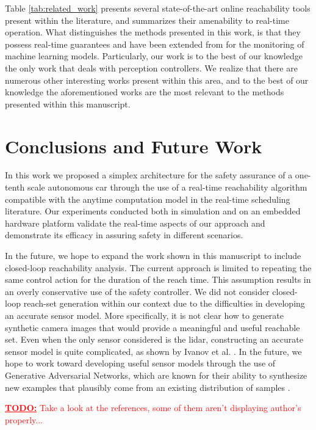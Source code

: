 \documentclass[manuscript,screen,review]{acmart}
\newcommand{\todo}[1]{\textcolor{red}{\textbf{\underline{TODO:}} #1}}
\begin{document}
Table \ref{tab:related_work} presents several state-of-the-art online reachability tools present within the literature, and summarizes their amenability to real-time operation. What distinguishes the methods presented in this work, is that they possess real-time guarantees and have been extended from \cite{Johnson2016} for the monitoring of machine learning models. Particularly, our work is to the best of our knowledge the only work that deals with perception controllers. We realize that there are numerous other interesting works present within this area, and to the best of our knowledge the aforementioned works are the most relevant to the methods presented within this manuscript.   

\section{Conclusions and Future Work}

In this work we proposed a simplex architecture for the safety assurance of a one-tenth scale autonomous car through the use of a real-time reachability algorithm compatible with the anytime computation model in the real-time scheduling literature. Our experiments conducted both in simulation and on an embedded hardware platform validate the real-time aspects of our approach and demonstrate its efficacy in assuring safety in different scenarios.

In the future, we hope to expand the work shown in this manuscript to include closed-loop reachability analysis. The current approach is limited to repeating the same control action for the duration of the reach time. This assumption results in an overly conservative use of the safety controller.%
We did not consider closed-loop reach-set generation within our context due to the difficulties in developing an accurate sensor model. More specifically, it is not clear how to generate synthetic camera images that would provide a meaningful and useful reachable set. Even when the only sensor considered is the lidar, constructing an accurate sensor model is quite complicated, as shown by Ivanov et al. \cite{ivanov2020case}. In the future, we hope to work toward developing useful sensor models through the use of Generative Adversarial Networks, which are known for their ability to synthesize new examples that plausibly come from an existing distribution of samples \cite{Radford2016,Brock2018,goodfellow2014}.

\todo{Take a look at the references, some of them aren't displaying author's properly...}





\appendix
\end{document}
